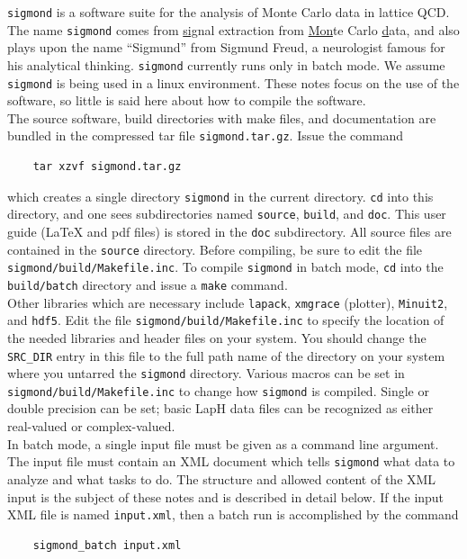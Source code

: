 \documentclass[12pt]{article}
\newcommand{\sigmond}{\texttt{sigmond} }
\newcommand{\vb}{\texttt}
\begin{document}
\sigmond is a software suite for the analysis of Monte Carlo data in
lattice QCD.  The name \texttt{sigmond} comes from \underline{sig}nal
extraction from \underline{Mon}te Carlo \underline{d}ata, and also plays
upon the name ``Sigmund'' from Sigmund Freud, a neurologist famous for
his analytical thinking.
\sigmond currently runs only in batch mode.
We assume \sigmond is being used
in a linux environment.  These notes focus on the use of the software,
so little is said here about how to compile the software.\\

The source software, build directories with make files, and documentation
are bundled in the compressed tar file \vb{sigmond.tar.gz}.  Issue the
command
\begin{verbatim}
    tar xzvf sigmond.tar.gz
\end{verbatim}
which creates a single directory \vb{sigmond} in the current directory.
\vb{cd} into this directory, and one sees subdirectories named \vb{source},
\vb{build}, and \vb{doc}.  This user guide (LaTeX and pdf files)
is stored in the \vb{doc} subdirectory.  All source files are contained in
the \vb{source} directory.   Before compiling, be sure to edit the file
\vb{sigmond/build/Makefile.inc}.  To compile \vb{sigmond} in batch mode,
\vb{cd} into the \vb{build/batch} directory and
issue a \vb{make} command. \\

Other libraries which are necessary include \vb{lapack}, \vb{xmgrace} (plotter),
\vb{Minuit2}, and \vb{hdf5}.
Edit the file
\vb{sigmond/build/Makefile.inc} to specify the location of the needed
libraries and header files on your system.  You should change the \vb{SRC\_DIR}
entry in this file to the full path name of the directory on your system
where you untarred the \vb{sigmond} directory.  Various macros can be set
in \vb{sigmond/build/Makefile.inc} to change how \vb{sigmond} is compiled.
Single or double precision can be set; basic LapH data files can be
recognized as either real-valued or complex-valued.\\

In batch mode, a single input file must be given as a command line
argument.  The input file must contain an XML document which
tells \sigmond what data to analyze and what tasks to do.  The structure
and allowed content of the XML input is the subject of these notes and
is described in detail below.  If the input XML file is named
\vb{input.xml}, then a batch run is accomplished by the command
\begin{verbatim}
    sigmond_batch input.xml
\end{verbatim}
\end{document}
